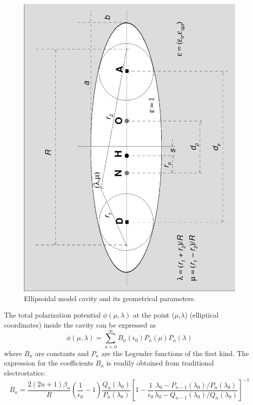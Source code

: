 \documentclass[oneside,11pt,openany]{book}
\begin{document}
\begin{figure}[!bbb]
\begin{center}
\includegraphics[scale=0.65,angle=-90]{ellips.eps}
\end{center}
\caption{Ellipsoidal model cavity and its geometrical parameters.}
\label{fig1}
\end{figure}
\par
The total polarization potential $\phi(\mu,\lambda)$ at the point ($\mu$,$\lambda$) (elliptical coordinates) inside the cavity
can be expressed as\cite{Kirkwood38}
\begin{equation}
\phi(\mu,\lambda)=\sum_{n=0}^{\infty}B_n(\epsilon_0)P_n(\mu)P_n(\lambda)
\label{phi_tot}
\end{equation}
where $B_n$ are constants and $P_n$ are the Legendre functions
of the first kind. The expression for the coefficients $B_n$
is readily obtained from traditional electrostatics:
\begin{equation}
B_n=\frac{2(2n+1)\beta_n}{R}\left(\frac{1}{\epsilon_0}-1\right)
\frac{Q_n(\lambda_0)}{P_n(\lambda_0)}
\left[1-\frac{1}{\epsilon_0}
\frac{\lambda_0-P_{n-1}(\lambda_0)/P_n(\lambda_0)}
     {\lambda_0-Q_{n-1}(\lambda_0)/Q_n(\lambda_0)}
\right]^{-1}
\label{bcoef}
\end{equation}
\end{document}
